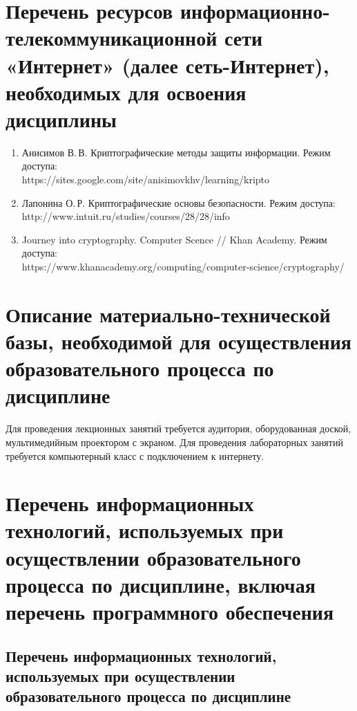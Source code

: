\documentclass[a4paper,12pt]{article}
\begin{document}
\section{Перечень ресурсов информационно-телекоммуникационной сети «Интернет» (далее сеть-Интернет), необходимых для освоения дисциплины}
\begin{enumerate}
  
  \item Анисимов В.\,В. Криптографические методы защиты информации. Режим доступа:\\ https://sites.google.com/site/anisimovkhv/learning/kripto 
  
  \item Лапонина О.\,Р. Криптографические основы безопасности.  Режим доступа:\\ http://www.intuit.ru/studies/courses/28/28/info 
  
  \item Journey into cryptography. Computer Scence // Khan Academy. Режим доступа:\\ https://www.khanacademy.org/computing/computer-science/cryptography/ 
  
\end{enumerate}


\newpage
\section{Описание материально-технической базы, необходимой для осуществления образовательного процесса по дисциплине}
  
  
       Для проведения лекционных занятий требуется аудитория, оборудованная доской,  мультимедийным проектором с экраном. 
       Для проведения лабораторных занятий требуется компьютерный класс с подключением к интернету.
  
  


\section{Перечень информационных технологий, используемых при осуществлении образовательного процесса по дисциплине, включая перечень программного обеспечения
}

\subsection{Перечень информационных технологий, используемых при осуществлении образовательного процесса по дисциплине}
\end{document}
